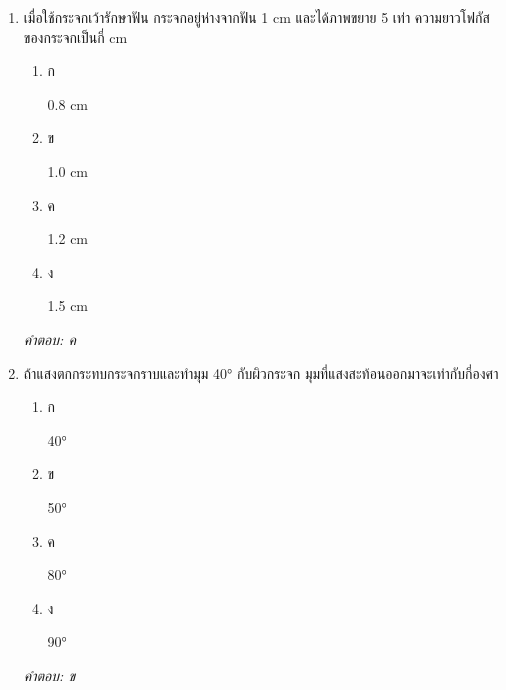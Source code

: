 \documentclass[12pt]{article}
\begin{document}
\begin{enumerate}[label=\arabic*., itemsep=0.5\baselineskip, topsep=0.5\baselineskip, leftmargin=*]
\item เมื่อใช้กระจกเว้ารักษาฟัน กระจกอยู่ห่างจากฟัน 1 cm และได้ภาพขยาย 5 เท่า ความยาวโฟกัสของกระจกเป็นกี่ cm
\begin{enumerate}[label=\alph*)., itemsep=0.3\baselineskip, topsep=0.3\baselineskip]
\item ก\ 
\begin{minipage}[t]{0.9\linewidth}
\raggedright 0.8 cm
\end{minipage}
\item ข\ 
\begin{minipage}[t]{0.9\linewidth}
\raggedright 1.0 cm
\end{minipage}
\item ค\ 
\begin{minipage}[t]{0.9\linewidth}
\raggedright 1.2 cm
\end{minipage}
\item ง\ 
\begin{minipage}[t]{0.9\linewidth}
\raggedright 1.5 cm
\end{minipage}
\end{enumerate}
\vspace{-0.3\baselineskip}
\begin{small}
\textit{คำตอบ: ค}
\end{small}

\item ถ้าแสงตกกระทบกระจกราบและทำมุม 40° กับผิวกระจก มุมที่แสงสะท้อนออกมาจะเท่ากับกี่องศา
\begin{enumerate}[label=\alph*)., itemsep=0.3\baselineskip, topsep=0.3\baselineskip]
\item ก\ 
\begin{minipage}[t]{0.9\linewidth}
\raggedright 40°
\end{minipage}
\item ข\ 
\begin{minipage}[t]{0.9\linewidth}
\raggedright 50°
\end{minipage}
\item ค\ 
\begin{minipage}[t]{0.9\linewidth}
\raggedright 80°
\end{minipage}
\item ง\ 
\begin{minipage}[t]{0.9\linewidth}
\raggedright 90°
\end{minipage}
\end{enumerate}
\vspace{-0.3\baselineskip}
\begin{small}
\textit{คำตอบ: ข}
\end{small}


\end{enumerate}
\end{document}
